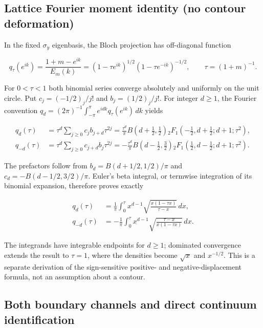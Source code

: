 \documentclass[
  10pt,
  a4paper,
]{article}
\begin{document}
\subsection{Lattice Fourier moment identity (no contour deformation)}\label{lattice-fourier-moment-identity-no-contour-deformation}

In the fixed \(\sigma_y\) eigenbasis, the Bloch projection has off-diagonal function

\[
q_\tau(e^{ik})=\frac{1+m-e^{ik}}{E_m(k)}
=\left(1-\tau e^{ik}\right)^{1/2}
 \left(1-\tau e^{-ik}\right)^{-1/2},\qquad \tau=(1+m)^{-1}.
\]

For \(0<\tau<1\) both binomial series converge absolutely and uniformly on the unit circle. Put \(c_j=(-1/2)_j/j!\) and \(b_j=(1/2)_j/j!\). For integer \(d\ge1\), the Fourier convention \(q_d=(2\pi)^{-1}\int_{-\pi}^{\pi}e^{idk}q_\tau(e^{ik})\,dk\) yields

\[
\begin{aligned}
q_d(\tau)&=\tau^d\sum_{j\ge0}c_jb_{j+d}\tau^{2j}
=\frac{\tau^d}{\pi}B(d+\tfrac12,\tfrac12)
{}_2F_1(-\tfrac12,d+\tfrac12;d+1;\tau^2),\\
q_{-d}(\tau)&=\tau^d\sum_{j\ge0}c_{j+d}b_j\tau^{2j}
=-\frac{\tau^d}{\pi}B(d-\tfrac12,\tfrac32)
{}_2F_1(\tfrac12,d-\tfrac12;d+1;\tau^2).
\end{aligned}
\]

The prefactors follow from \(b_d=B(d+1/2,1/2)/\pi\) and \(c_d=-B(d-1/2,3/2)/\pi\). Euler's beta integral, or termwise integration of its binomial expansion, therefore proves exactly

\[
\boxed{\begin{aligned}
q_d(\tau)&=\frac1\pi\int_0^\tau x^{d-1}
\sqrt{\frac{x(1-\tau x)}{\tau-x}}\,dx,\\
q_{-d}(\tau)&=-\frac1\pi\int_0^\tau x^{d-1}
\sqrt{\frac{\tau-x}{x(1-\tau x)}}\,dx.
\end{aligned}}
\tag{B1}
\]

The integrands have integrable endpoints for \(d\ge1\); dominated convergence extends the result to \(\tau=1\), where the densities become \(\sqrt{x}\) and \(x^{-1/2}\). This is a separate derivation of the sign-sensitive positive- and negative-displacement formula, not an assumption about a contour.

\subsection{Both boundary channels and direct continuum identification}\label{both-boundary-channels-and-direct-continuum-identification}
\end{document}

